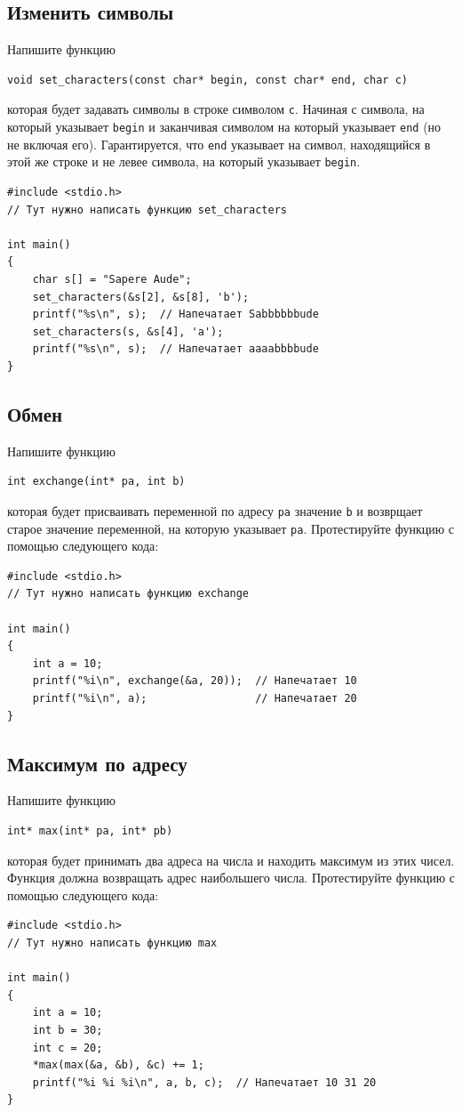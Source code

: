 \documentclass{article}
\begin{document}
\subsection{Изменить символы}
Напишите функцию
\begin{lstlisting}
void set_characters(const char* begin, const char* end, char c)
\end{lstlisting}
которая будет задавать символы в строке символом \texttt{c}. Начиная с символа, на который указывает \texttt{begin} и заканчивая символом на который указывает \texttt{end} (но не включая его). Гарантируется, что \texttt{end} указывает на символ, находящийся в этой же строке и не левее символа, на который указывает \texttt{begin}.
\begin{lstlisting}
#include <stdio.h>
// Тут нужно написать функцию set_characters

int main() 
{
    char s[] = "Sapere Aude";
    set_characters(&s[2], &s[8], 'b');
    printf("%s\n", s);  // Напечатает Sabbbbbbude
    set_characters(s, &s[4], 'a');
    printf("%s\n", s);  // Напечатает aaaabbbbude
}
\end{lstlisting}


\subsection{Обмен}
Напишите функцию
\begin{lstlisting}
int exchange(int* pa, int b)
\end{lstlisting}
которая будет присваивать переменной по адресу \texttt{pa} значение \texttt{b} и возврщает старое значение переменной, на которую указывает \texttt{pa}. Протестируйте функцию с помощью следующего кода:
\begin{lstlisting}
#include <stdio.h>
// Тут нужно написать функцию exchange

int main() 
{
    int a = 10;
    printf("%i\n", exchange(&a, 20));  // Напечатает 10
    printf("%i\n", a);                 // Напечатает 20
}
\end{lstlisting} 

\subsection{Максимум по адресу}
Напишите функцию
\begin{lstlisting}
int* max(int* pa, int* pb)
\end{lstlisting}
которая будет принимать два адреса на числа и находить максимум из этих чисел.
Функция должна возвращать адрес наибольшего числа. Протестируйте функцию с помощью следующего кода:
\begin{lstlisting}
#include <stdio.h>
// Тут нужно написать функцию max

int main() 
{
    int a = 10;
    int b = 30;
    int c = 20;
    *max(max(&a, &b), &c) += 1;
    printf("%i %i %i\n", a, b, c);  // Напечатает 10 31 20
}
\end{lstlisting} 
\end{document}

